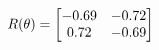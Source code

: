 \documentclass[preview]{standalone}
\begin{document}
\begin{align*}
\special{dvisvgm:raw <g id='unique000'>}R(\theta) = \begin{bmatrix}-0.69 & -0.72\\0.72 & -0.69\end{bmatrix}\special{dvisvgm:raw </g>}
\end{align*}
\end{document}
